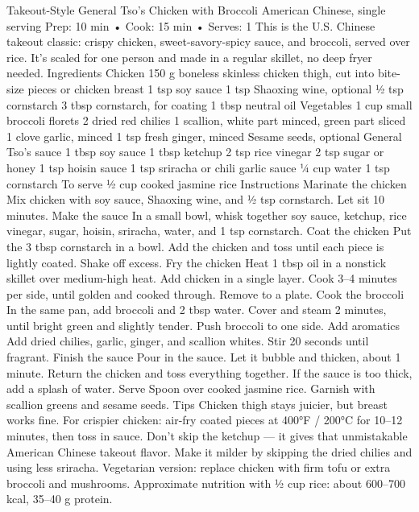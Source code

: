 Takeout-Style General Tso’s Chicken with Broccoli American Chinese, single serving Prep: 10 min • Cook: 15 min • Serves: 1 This is the U.S. Chinese takeout classic: crispy chicken, sweet-savory-spicy sauce, and broccoli, served over rice. It’s scaled for one person and made in a regular skillet, no deep fryer needed. Ingredients Chicken 150 g boneless skinless chicken thigh, cut into bite-size pieces or chicken breast 1 tsp soy sauce 1 tsp Shaoxing wine, optional ½ tsp cornstarch 3 tbsp cornstarch, for coating 1 tbsp neutral oil Vegetables 1 cup small broccoli florets 2 dried red chilies 1 scallion, white part minced, green part sliced 1 clove garlic, minced 1 tsp fresh ginger, minced Sesame seeds, optional General Tso’s sauce 1 tbsp soy sauce 1 tbsp ketchup 2 tsp rice vinegar 2 tsp sugar or honey 1 tsp hoisin sauce 1 tsp sriracha or chili garlic sauce ¼ cup water 1 tsp cornstarch To serve ½ cup cooked jasmine rice Instructions Marinate the chicken Mix chicken with soy sauce, Shaoxing wine, and ½ tsp cornstarch. Let sit 10 minutes. Make the sauce In a small bowl, whisk together soy sauce, ketchup, rice vinegar, sugar, hoisin, sriracha, water, and 1 tsp cornstarch. Coat the chicken Put the 3 tbsp cornstarch in a bowl. Add the chicken and toss until each piece is lightly coated. Shake off excess. Fry the chicken Heat 1 tbsp oil in a nonstick skillet over medium-high heat. Add chicken in a single layer. Cook 3–4 minutes per side, until golden and cooked through. Remove to a plate. Cook the broccoli In the same pan, add broccoli and 2 tbsp water. Cover and steam 2 minutes, until bright green and slightly tender. Push broccoli to one side. Add aromatics Add dried chilies, garlic, ginger, and scallion whites. Stir 20 seconds until fragrant. Finish the sauce Pour in the sauce. Let it bubble and thicken, about 1 minute. Return the chicken and toss everything together. If the sauce is too thick, add a splash of water. Serve Spoon over cooked jasmine rice. Garnish with scallion greens and sesame seeds. Tips Chicken thigh stays juicier, but breast works fine. For crispier chicken: air-fry coated pieces at 400°F / 200°C for 10–12 minutes, then toss in sauce. Don’t skip the ketchup — it gives that unmistakable American Chinese takeout flavor. Make it milder by skipping the dried chilies and using less sriracha. Vegetarian version: replace chicken with firm tofu or extra broccoli and mushrooms. Approximate nutrition with ½ cup rice: about 600–700 kcal, 35–40 g protein.
\par

